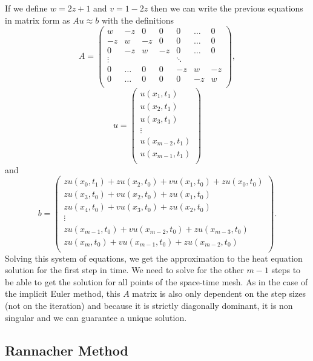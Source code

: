\documentclass[00main.tex]{subfiles}
\begin{document}
If we define $w= 2z+1$ and $v = 1-2z$ then we can write the previous equations in matrix form as $Au \approx b$ with the definitions \[ A = \left( \begin{array}{ccccccc}
w & -z & 0 & 0 & 0 & \hdots & 0\\
-z & w & -z & 0 & 0 & \hdots & 0\\
0 & -z & w & -z & 0 & \hdots & 0\\
\vdots &  &  &  & \ddots &  & \\
0 & \hdots & 0 & 0 & -z & w & -z\\
0 & \hdots & 0 & 0 & 0 & -z & w\\
\end{array} \right), \] \[ u = \left( \begin{array}{c}
u (x_1, t_1)\\
u (x_2, t_1)\\
u (x_3, t_1)\\
\vdots\\
u(x_{m-2}, t_1)\\
u(x_{m-1}, t_1)\\
\end{array} \right) \] and \[ b= \left( \begin{array}{c}
z u (x_0, t_1) + z u(x_2, t_0) + v u (x_1, t_0) + z u(x_0, t_0)\\
z u(x_3, t_0) + v u (x_2, t_0) + z u(x_1, t_0)\\
z u(x_4, t_0) + v u (x_3, t_0) + z u(x_2, t_0)\\
\vdots \\
z u(x_{m-1}, t_0) + v u (x_{m-2}, t_0) + z u(x_{m-3}, t_0)\\
z u(x_m, t_0) + v u (x_{m-1}, t_0) + z u(x_{m-2}, t_0)\\
\end{array} \right) . \] Solving this system of equations, we get the approximation to the heat equation solution for the first step in time. We need to solve for the other $m-1$ steps to be able to get the solution for all points of the space-time mesh. As in the case of the implicit Euler method, this $A$ matrix is also only dependent on the step sizes (not on the iteration) and because it is strictly diagonally dominant, it is non singular and we can guarantee a unique solution.


\subsection{Rannacher Method}
\end{document}
